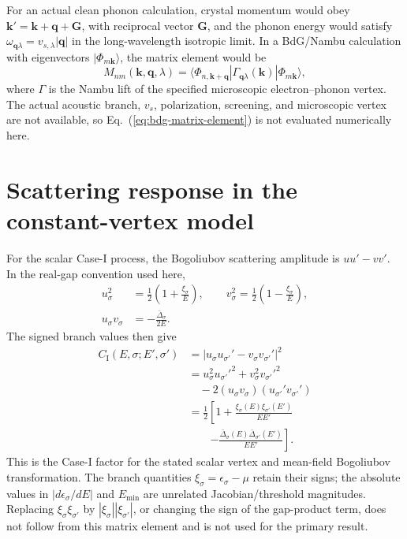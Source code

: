 \documentclass[aps,prb,reprint,superscriptaddress]{revtex4-2}
\newcommand{\Dbar}{\bar\Delta}
\begin{document}
For an actual clean phonon calculation, crystal momentum would obey $\bm k'=\bm k+\bm q+\bm G$, with reciprocal vector $\bm G$, and the phonon energy would satisfy $\omega_{\bm q\lambda}=v_{s,\lambda}|\bm q|$ in the long-wavelength isotropic limit. In a BdG/Nambu calculation with eigenvectors $|\Phi_{m\bm k}\rangle$, the matrix element would be
\begin{equation}
 M_{nm}(\bm k,\bm q,\lambda)=
 \langle\Phi_{n,\bm{k+q}}|\Gamma_{\bm q\lambda}(\bm k)|\Phi_{m\bm k}\rangle,
 \label{eq:bdg-matrix-element}
\end{equation}
where $\Gamma$ is the Nambu lift of the specified microscopic electron--phonon vertex. The actual acoustic branch, $v_s$, polarization, screening, and microscopic vertex are not available, so Eq.~(\ref{eq:bdg-matrix-element}) is not evaluated numerically here.

\section{Scattering response in the constant-vertex model}

For the scalar Case-I process, the Bogoliubov scattering amplitude is $u u'-v v'$. In the real-gap convention used here,
\begin{equation}
\begin{aligned}
 u_\sigma^2&=\frac12\left(1+\frac{\xi_\sigma}{E}\right),\qquad
 v_\sigma^2=\frac12\left(1-\frac{\xi_\sigma}{E}\right),\\
 u_\sigma v_\sigma&=-\frac{\Dbar_\sigma}{2E}.
\end{aligned}
\end{equation}
The signed branch values then give
\begin{equation}
\begin{aligned}
 C_{\mathrm{I}}(E,\sigma;E',\sigma')
 &=|u_\sigma u_{\sigma'}'-v_\sigma v_{\sigma'}'|^2\\
 &=u_\sigma^2u_{\sigma'}'^2+v_\sigma^2v_{\sigma'}'^2\\
 &\quad-2(u_\sigma v_\sigma)(u_{\sigma'}'v_{\sigma'}')\\
 &=\frac12\left[1+
 \frac{\xi_\sigma(E)\xi_{\sigma'}(E')}{EE'}\right.\\
 &\qquad\left.-\frac{\Dbar_\sigma(E)\Dbar_{\sigma'}(E')}{EE'}\right].
\end{aligned}
\label{eq:coherence}
\end{equation}
This is the Case-I factor for the stated scalar vertex and mean-field Bogoliubov transformation. The branch quantities $\xi_\sigma=\epsilon_\sigma-\mu$ retain their signs; the absolute values in $|d\epsilon_\sigma/dE|$ and $E_{\min}$ are unrelated Jacobian/threshold magnitudes. Replacing $\xi_\sigma\xi_{\sigma'}$ by $|\xi_\sigma||\xi_{\sigma'}|$, or changing the sign of the gap-product term, does not follow from this matrix element and is not used for the primary result.
\end{document}

